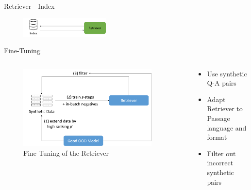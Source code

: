 \documentclass{beamer}
\begin{document}
\begin{frame}{Retriever - Index}
  \begin{figure}
    \includegraphics[width=0.4\textwidth]{Grafiken/Retriever_Index.png}
  \end{figure}

  \begin{block}{Fine-Tuning}
    \begin{columns}
      \begin{column}{.55\textwidth}
        \begin{figure}
          \includegraphics[width=0.9\textwidth]{Grafiken/Training.png}
          \caption{Fine-Tuning of the Retriever}
        \end{figure}
      \end{column}

      \begin{column}{.45\textwidth}
        \begin{itemize}
          \item Use synthetic Q-A pairs
          \item Adapt Retriever to Passage language and format 
          \item Filter out incorrect synthetic pairs
        \end{itemize}
      \end{column}
    \end{columns}
  \end{block}
  \vfill
\end{frame}
\end{document}
